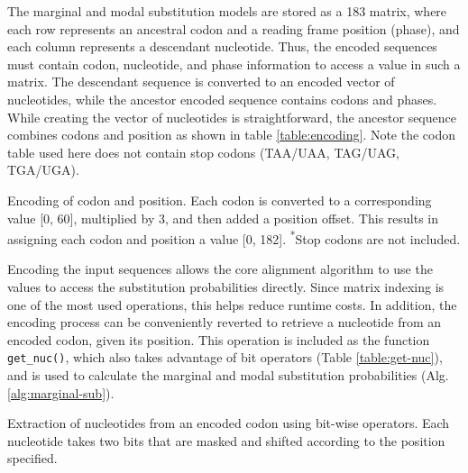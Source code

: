 The marginal and modal substitution models are stored as a 183 matrix, where each row represents an ancestral codon and a reading frame position (phase), and each column represents a descendant nucleotide. Thus, the encoded sequences must contain codon, nucleotide, and phase information to access a value in such a matrix. The descendant sequence is converted to an encoded vector of nucleotides, while the ancestor encoded sequence contains codons and phases. While creating the vector of nucleotides is straightforward, the ancestor sequence combines codons and position as shown in table \ref{table:encoding}. Note the codon table used here does not contain stop codons (TAA/UAA, TAG/UAG, TGA/UGA).
\begin{table}[!ht]
 \centering
 
 \vspace{2mm}
 \caption[Sequence Encoding]{Encoding of codon and position. Each codon is converted to a corresponding value [0, 60], multiplied by 3, and then added a position offset. This results in assigning each codon and position a value [0, 182]. \textsuperscript{*}Stop codons are not included.}
 \label{table:encoding}
\end{table}

Encoding the input sequences allows the core alignment algorithm to use the values to access the substitution probabilities directly. Since matrix indexing is one of the most used operations, this helps reduce runtime costs. In addition, the encoding process can be conveniently reverted to retrieve a nucleotide from an encoded codon, given its position. This operation is included as the function \verb|get_nuc()|, which also takes advantage of bit operators (Table \ref{table:get-nuc}), and is used to calculate the marginal and modal substitution probabilities (Alg. \ref{alg:marginal-sub}).

\begin{table}[!ht]
 \centering
 
 \vspace{2mm}
 \caption[Get Nucleotide from Codon]{Extraction of nucleotides from an encoded codon using bit-wise operators. Each nucleotide takes two bits that are masked and shifted according to the position specified.}
 \label{table:get-nuc}
\end{table}

\vspace{6em}




